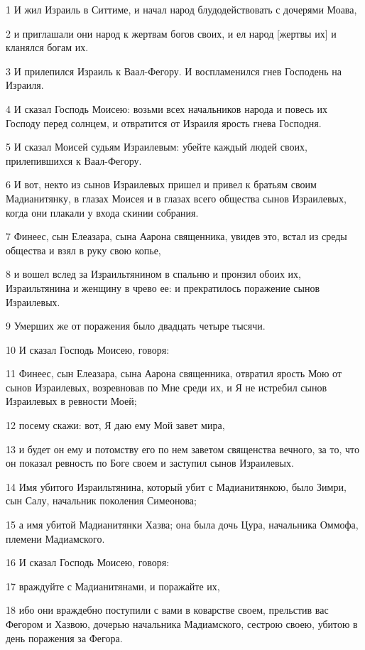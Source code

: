 \par 1 И жил Израиль в Ситтиме, и начал народ блудодействовать с дочерями Моава,
\par 2 и приглашали они народ к жертвам богов своих, и ел народ [жертвы их] и кланялся богам их.
\par 3 И прилепился Израиль к Ваал-Фегору. И воспламенился гнев Господень на Израиля.
\par 4 И сказал Господь Моисею: возьми всех начальников народа и повесь их Господу перед солнцем, и отвратится от Израиля ярость гнева Господня.
\par 5 И сказал Моисей судьям Израилевым: убейте каждый людей своих, прилепившихся к Ваал-Фегору.
\par 6 И вот, некто из сынов Израилевых пришел и привел к братьям своим Мадианитянку, в глазах Моисея и в глазах всего общества сынов Израилевых, когда они плакали у входа скинии собрания.
\par 7 Финеес, сын Елеазара, сына Аарона священника, увидев это, встал из среды общества и взял в руку свою копье,
\par 8 и вошел вслед за Израильтянином в спальню и пронзил обоих их, Израильтянина и женщину в чрево ее: и прекратилось поражение сынов Израилевых.
\par 9 Умерших же от поражения было двадцать четыре тысячи.
\par 10 И сказал Господь Моисею, говоря:
\par 11 Финеес, сын Елеазара, сына Аарона священника, отвратил ярость Мою от сынов Израилевых, возревновав по Мне среди их, и Я не истребил сынов Израилевых в ревности Моей;
\par 12 посему скажи: вот, Я даю ему Мой завет мира,
\par 13 и будет он ему и потомству его по нем заветом священства вечного, за то, что он показал ревность по Боге своем и заступил сынов Израилевых.
\par 14 Имя убитого Израильтянина, который убит с Мадианитянкою, было Зимри, сын Салу, начальник поколения Симеонова;
\par 15 а имя убитой Мадианитянки Хазва; она была дочь Цура, начальника Оммофа, племени Мадиамского.
\par 16 И сказал Господь Моисею, говоря:
\par 17 враждуйте с Мадианитянами, и поражайте их,
\par 18 ибо они враждебно поступили с вами в коварстве своем, прельстив вас Фегором и Хазвою, дочерью начальника Мадиамского, сестрою своею, убитою в день поражения за Фегора.

